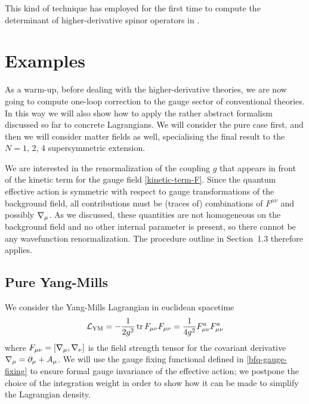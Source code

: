 This kind of technique has employed for the first time to compute the determinant of higher-derivative spinor operators in \cite{Fradkin:1981jc}.



\section{Examples}

As a warm-up, before dealing with the higher-derivative  theories, we are now going to compute one-loop correction to the gauge sector of conventional \ym{} theories. In this way we will also show how to apply the rather abstract formalism discussed so far to concrete Lagrangians.
%
 We will consider the pure \ym{} case first, and then we will consider matter fields as well, specialising the final result to the $N=1$, $2$, $4$ supersymmetric extension. 


We are interested in the renormalization of the \ym{} coupling $g$ that appears in front of the kinetic term for the gauge field \eqref{kinetic-term-F}. Since the quantum effective action is symmetric with respect to gauge transformations of the background field, all contributions must be (traces of) combinations of $F^{\mu\nu}$ and possibly ${ \mathcal{\nabla} }_\mu$. As we discussed, these quantities are not homogeneous on the background field and no other internal parameter is present, so there cannot be any wavefunction renormalization. The procedure outline in Section~1.3 therefore applies.








\subsection{Pure Yang-Mills}



We consider the Yang-Mills Lagrangian in euclidean spacetime
\begin{equation}\label{L-YM-abstract}
\mathcal{L}_{ \text{YM} } 
	=
	- \frac{1}{2 g^2} \operatorname{tr}	F_{\mu\nu} F_{\mu\nu}
	=
	\frac{1}{4 g^2} F_{\mu\nu}^a F_{\mu\nu}^a
\end{equation}
where
\(
F_{\mu\nu} = [{ \mathcal{\nabla} }_\mu, { \mathcal{\nabla} }_\nu]
\)
is the field strength tensor for the covariant derivative \( { \mathcal{\nabla} }_\mu = \partial_\mu + A_\mu \). We will use the gauge fixing functional defined in \eqref{bfq-gauge-fixing} to ensure formal gauge invariance of the effective action; we postpone the choice of the integration weight in order to show how it can be made to simplify the Lagrangian density.

